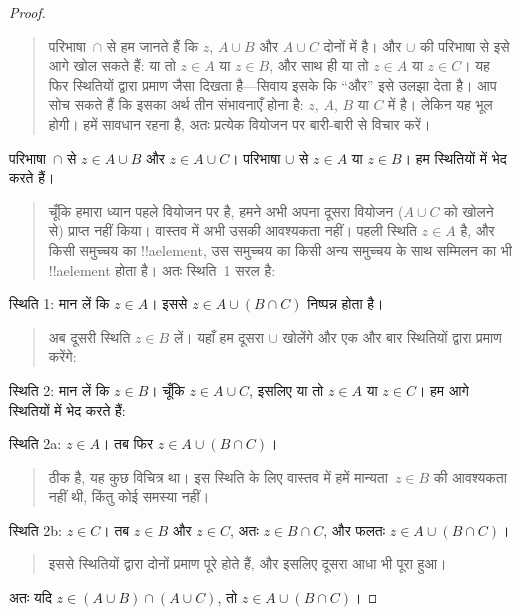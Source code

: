 \documentclass[../../../include/open-logic-section]{subfiles}
\begin{document}
\begin{proof}
\begin{quote}
परिभाषा~$\cap$ से हम जानते हैं कि $z$, $A \cup B$ और $A \cup C$ दोनों
में है। और $\cup$ की परिभाषा से इसे आगे खोल सकते हैं: या तो $z \in A$ या
$z \in B$, और साथ ही या तो $z \in A$ या $z \in C$। यह फिर स्थितियों
द्वारा प्रमाण जैसा दिखता है---सिवाय इसके कि ``और'' इसे उलझा देता है। आप सोच
सकते हैं कि इसका अर्थ तीन संभावनाएँ होना है: $z$, $A$, $B$ या $C$ में है।
लेकिन यह भूल होगी। हमें सावधान रहना है, अतः प्रत्येक वियोजन पर बारी-बारी से
विचार करें।
\end{quote}
परिभाषा~$\cap$ से $z \in A \cup B$ और $z \in A \cup C$। परिभाषा
$\cup$ से $z \in A$ या $z \in B$। हम स्थितियों में भेद करते हैं।
\begin{quote}
चूँकि हमारा ध्यान पहले वियोजन पर है, हमने अभी अपना दूसरा वियोजन ($A \cup
C$ को खोलने से) प्राप्त नहीं किया। वास्तव में अभी उसकी आवश्यकता नहीं। पहली
स्थिति $z \in A$ है, और किसी समुच्चय का !!a{element}, उस समुच्चय का किसी
अन्य समुच्चय के साथ सम्मिलन का भी !!a{element} होता है। अतः स्थिति~1 सरल
है:
\end{quote}
स्थिति 1: मान लें कि $z \in A$। इससे $z \in A \cup (B \cap C)$ निष्पन्न
होता है।
\begin{quote}
अब दूसरी स्थिति $z \in B$ लें। यहाँ हम दूसरा $\cup$ खोलेंगे और एक और बार
स्थितियों द्वारा प्रमाण करेंगे:
\end{quote}
स्थिति 2: मान लें कि $z \in B$। चूँकि $z \in A \cup C$, इसलिए या तो $z
\in A$ या $z \in C$। हम आगे स्थितियों में भेद करते हैं:

स्थिति 2a: $z \in A$। तब फिर $z \in A \cup (B \cap C)$।
\begin{quote}
ठीक है, यह कुछ विचित्र था। इस स्थिति के लिए वास्तव में हमें मान्यता~$z \in
B$ की आवश्यकता नहीं थी, किंतु कोई समस्या नहीं।
\end{quote}
स्थिति 2b: $z \in C$। तब $z \in B$ और $z \in C$, अतः $z \in B \cap
C$, और फलतः $z \in A \cup (B \cap C)$।
\begin{quote}
इससे स्थितियों द्वारा दोनों प्रमाण पूरे होते हैं, और इसलिए दूसरा आधा भी
पूरा हुआ।
\end{quote}
अतः यदि $z \in (A \cup B) \cap (A \cup C)$, तो $z \in A \cup (B \cap
C)$।
\end{proof}
\end{document}
